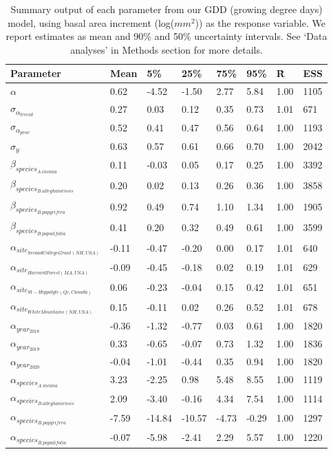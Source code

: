 \documentclass{article}\usepackage[]{graphicx}\usepackage[]{xcolor}
\begin{document}
\begin{table}[ht]
\centering
\caption{Summary output of each parameter from our GDD (growing degree days) model, using basal area increment (log($mm^2$)) as the response variable. We report estimates as mean and 90\% and 50\% uncertainty intervals. See `Data analyses' in Methods section for more details.} 
\label{tab:BAItab}
\begin{tabular}{llllllll}
  \hline
Parameter & Mean & 5\% & 25\% & 75\% & 95\% & \^R & ESS \\ 
  \hline
$\alpha$ & 0.62 & -4.52 & -1.50 & 2.77 & 5.84 & 1.00 & 1105 \\ 
  $\sigma_{\alpha_{treeid}}$ & 0.27 & 0.03 & 0.12 & 0.35 & 0.73 & 1.01 & 671 \\ 
  $\sigma_{\alpha_{prov}}$ & 0.52 & 0.41 & 0.47 & 0.56 & 0.64 & 1.00 & 1193 \\ 
  $\sigma_{y}$ & 0.63 & 0.57 & 0.61 & 0.66 & 0.70 & 1.00 & 2042 \\ 
  $\beta_{species_{A. incana}}$ & 0.11 & -0.03 & 0.05 & 0.17 & 0.25 & 1.00 & 3392 \\ 
  $\beta_{species_{B. alleghaniensis}}$ & 0.20 & 0.02 & 0.13 & 0.26 & 0.36 & 1.00 & 3858 \\ 
  $\beta_{species_{B. papyrifera}}$ & 0.92 & 0.49 & 0.74 & 1.10 & 1.34 & 1.00 & 1905 \\ 
  $\beta_{species_{B. populifolia}}$ & 0.41 & 0.20 & 0.32 & 0.49 & 0.61 & 1.00 & 3599 \\ 
  $\alpha_{site_{Second College Grant (NH, USA)}}$ & -0.11 & -0.47 & -0.20 & 0.00 & 0.17 & 1.01 & 640 \\ 
  $\alpha_{site_{Harvard Forest (MA, USA)}}$ & -0.09 & -0.45 & -0.18 & 0.02 & 0.19 & 1.01 & 629 \\ 
  $\alpha_{site_{St-Hippolyte (Qc, Canada)}}$ & 0.06 & -0.23 & -0.04 & 0.15 & 0.42 & 1.01 & 651 \\ 
  $\alpha_{site_{White Mountains (NH, USA)}}$ & 0.15 & -0.11 & 0.02 & 0.26 & 0.52 & 1.01 & 678 \\ 
  $\alpha_{year_{2018}}$ & -0.36 & -1.32 & -0.77 & 0.03 & 0.61 & 1.00 & 1820 \\ 
  $\alpha_{year_{2019}}$ & 0.33 & -0.65 & -0.07 & 0.73 & 1.32 & 1.00 & 1836 \\ 
  $\alpha_{year_{2020}}$ & -0.04 & -1.01 & -0.44 & 0.35 & 0.94 & 1.00 & 1820 \\ 
  $\alpha_{species_{A. incana}}$ & 3.23 & -2.25 & 0.98 & 5.48 & 8.55 & 1.00 & 1119 \\ 
  $\alpha_{species_{B. alleghaniensis}}$ & 2.09 & -3.40 & -0.16 & 4.34 & 7.54 & 1.00 & 1114 \\ 
  $\alpha_{species_{B. papyrifera}}$ & -7.59 & -14.84 & -10.57 & -4.73 & -0.29 & 1.00 & 1297 \\ 
  $\alpha_{species_{B. populifolia}}$ & -0.07 & -5.98 & -2.41 & 2.29 & 5.57 & 1.00 & 1220 \\ 
   \hline
\end{tabular}
\end{table}
\end{document}
